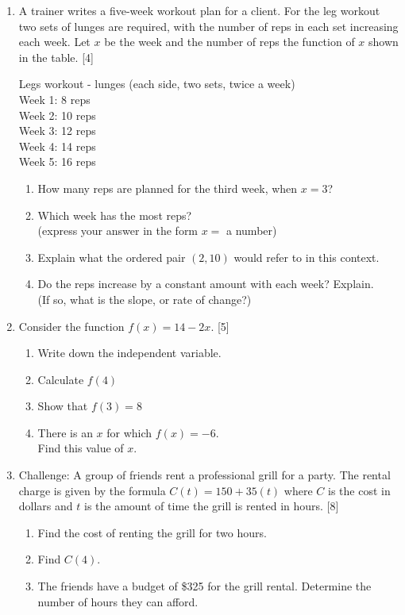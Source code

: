 \documentclass[12pt, twoside]{article}
\begin{document}
\begin{enumerate}
\newpage
\item A trainer writes a five-week workout plan for a client. For the leg workout two sets of lunges are required, with the number of reps in each set increasing each week. Let $x$ be the week and the number of reps the function of $x$ shown in the table. \hfill [4]
  \begin{center}
      Legs workout - lunges (each side, two sets, twice a week)\\
        Week 1: 8 reps\\
        Week 2: 10 reps\\
        Week 3: 12 reps\\
        Week 4: 14 reps\\
        Week 5: 16 reps
    \end{center}
\begin{enumerate}[itemsep=0.25cm]
  \item How many reps are planned for the third week, when $x=3$?
  \item Which week has the most reps? \\(express your answer in the form $x=$ a number)
  \item Explain what the ordered pair $(2,10)$ would refer to in this context.\vspace{1cm}
  \item Do the reps increase by a constant amount with each week? Explain. \\(If so, what is the slope, or rate of change?) \vspace{1.5cm}
\end{enumerate}

\item Consider the function $f(x)=14-2x$. \hfill [5]
\begin{enumerate}
  \item Write down the independent variable.
  \item Calculate $f(4)$ \vspace{2cm}
  \item Show that $f(3)= 8$ \vspace{2cm}
  \item There is an $x$ for which $f(x)= -6$. \\ Find this value of $x$.
\end{enumerate} \vspace{2cm}

\newpage
\item Challenge: A group of friends rent a professional grill for a party. The rental charge is given by the formula $C(t) = 150 + 35(t)$ where $C$ is the cost in dollars and $t$ is the amount of time the grill is rented in hours. \hfill [8]
\begin{enumerate}[itemsep=2cm]
  \item Find the cost of renting the grill for two hours.
  \item Find $C(4)$.
  \item The friends have a budget of \$325 for the grill rental. Determine the number of hours they can afford.
\end{enumerate} \vspace{3cm}


\end{enumerate}
\end{document}
